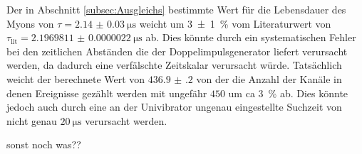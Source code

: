 Der in Abschnitt \ref{subsec:Ausgleichs} bestimmte Wert für die Lebensdauer des Myons von $\tau=\SI{2.14(3)}{\micro\second}$ weicht um \SI{3(1)}{\percent} vom Literaturwert von $\tau_\text{lit}=\SI{2.1969811(22)}{\micro\second}$ \cite{ParticlePhysics} ab. Dies könnte durch ein systematischen Fehler bei den zeitlichen Abständen die der Doppelimpulsgenerator liefert verursacht werden, da dadurch eine verfälschte Zeitskalar verursacht würde. Tatsächlich weicht der berechnete Wert von $\num{436.9(2)}$ von der die Anzahl der Kanäle in denen Ereignisse gezählt werden mit ungefähr $450$ um ca \SI{3}{\percent} ab. Dies könnte jedoch auch durch eine an der Univibrator ungenau eingestellte Suchzeit von nicht genau $\SI{20}{\micro\second}$ verursacht werden.




sonst noch was??